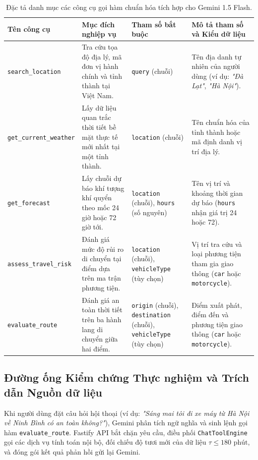 \begin{table}[H]
\centering
\small
\caption[Đặc tả các công cụ gọi hàm của Trợ lý AI VietForecast]{Đặc tả danh mục các công cụ gọi hàm chuẩn hóa tích hợp cho Gemini 1.5 Flash.}
\label{tab:gemini_tool_schema_vi}
\begin{tabularx}{\textwidth}{l >{\raggedright\arraybackslash}p{3.4cm} >{\raggedright\arraybackslash}p{2.8cm} X}
\toprule
\textbf{Tên công cụ} & \textbf{Mục đích nghiệp vụ} & \textbf{Tham số bắt buộc} & \textbf{Mô tả tham số và Kiểu dữ liệu} \\
\midrule
\texttt{search\_location} & Tra cứu tọa độ địa lý, mã đơn vị hành chính và tỉnh thành tại Việt Nam. & \texttt{query} (chuỗi) & Tên địa danh tự nhiên của người dùng (ví dụ: \textit{"Đà Lạt"}, \textit{"Hà Nội"}). \\
\addlinespace
\texttt{get\_current\_weather} & Lấy dữ liệu quan trắc thời tiết bề mặt thực tế mới nhất tại một tỉnh thành. & \texttt{location} (chuỗi) & Tên chuẩn hóa của tỉnh thành hoặc mã định danh vị trí địa lý. \\
\addlinespace
\texttt{get\_forecast} & Lấy chuỗi dự báo khí tượng khí quyển theo mốc 24 giờ hoặc 72 giờ tới. & \texttt{location} (chuỗi), \newline \texttt{hours} (số nguyên) & Tên vị trí và khoảng thời gian dự báo (\texttt{hours} nhận giá trị 24 hoặc 72). \\
\addlinespace
\texttt{assess\_travel\_risk} & Đánh giá mức độ rủi ro di chuyển tại điểm dựa trên ma trận phương tiện. & \texttt{location} (chuỗi), \newline \texttt{vehicle}\allowbreak\texttt{Type} (tùy chọn) & Vị trí tra cứu và loại phương tiện tham gia giao thông (\texttt{car} hoặc \texttt{motorcycle}). \\
\addlinespace
\texttt{evaluate\_route} & Đánh giá an toàn thời tiết trên ba hành lang di chuyển giữa hai điểm. & \texttt{origin} (chuỗi), \newline \texttt{desti}\allowbreak\texttt{nation} (chuỗi), \newline \texttt{vehicle}\allowbreak\texttt{Type} (tùy chọn) & Điểm xuất phát, điểm đến và phương tiện giao thông (\texttt{car} hoặc \texttt{motorcycle}). \\
\bottomrule
\end{tabularx}
\end{table}

\subsection{Đường ống Kiểm chứng Thực nghiệm và Trích dẫn Nguồn dữ liệu}
Khi người dùng đặt câu hỏi hội thoại (ví dụ: \textit{"Sáng mai tôi đi xe máy từ Hà Nội về Ninh Bình có an toàn không?"}), Gemini phân tích ngữ nghĩa và sinh lệnh gọi hàm \texttt{evaluate\_route}. Fastify API bắt chặn yêu cầu, điều phối \texttt{ChatToolEngine} gọi các dịch vụ tính toán nội bộ, đối chiếu độ tươi mới của dữ liệu $\tau \le 180\text{ phút}$, và đóng gói kết quả phản hồi gửi lại Gemini.

